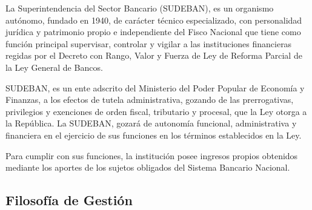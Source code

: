 \documentclass[]{article}
\begin{document}
La Superintendencia del Sector Bancario (SUDEBAN), es un organismo
autónomo, fundado en 1940, de carácter técnico especializado, con
personalidad jurídica y patrimonio propio e independiente del Fisco
Nacional que tiene como función principal supervisar, controlar y
vigilar a las instituciones financieras regidas por el Decreto con
Rango, Valor y Fuerza de Ley de Reforma Parcial de la Ley General de
Bancos.

SUDEBAN, es un ente adscrito del Ministerio del Poder Popular de
Economía y Finanzas, a los efectos de tutela administrativa, gozando de
las prerrogativas, privilegios y exenciones de orden fiscal, tributario
y procesal, que la Ley otorga a la República. La SUDEBAN, gozará de
autonomía funcional, administrativa y financiera en el ejercicio de sus
funciones en los términos establecidos en la Ley.

Para cumplir con sus funciones, la institución posee ingresos propios
obtenidos mediante los aportes de los sujetos obligados del Sistema
Bancario Nacional.

\hypertarget{filosofia-de-gestion}{%
\subsection{Filosofía de Gestión}\label{filosofia-de-gestion}}
\end{document}
